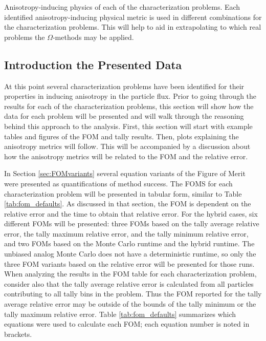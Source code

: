 \begin{table}[h!]
  \centering
  
  \caption[Anisotropy-inducing physics of each of the characterization problems.]
  {Anisotropy-inducing physics of each of the characterization problems.
  Each identified anisotropy-inducing physical metric is used in different
  combinations for the characterization problems. This will help to aid in
  extrapolating to which real problems the $\Omega$-methods may be applied.}
  \label{tab:probphysics}
\end{table}

\subsection{Introduction the Presented Data}
\label{subsec:resultsintro}

At this point several characterization problems have been identified for their
properties in inducing anisotropy in the particle flux.
Prior to going through the results for each of the characterization problems,
this section will show how the data for each problem will be presented and will
walk through the reasoning behind this approach to the analysis. First, this
section will start with example tables and figures of the FOM and tally results.
Then, plots explaining the anisotropy metrics will follow. This will be
accompanied by a
discussion about how the anisotropy metrics will be related to the FOM and the
relative error.

In Section \ref{sec:FOMvariants} several equation variants of
the Figure of Merit were
presented as quantifications of method success. The FOMS for each
characterization problem will be presented in tabular form, similar to Table
\ref{tab:fom_defaults}. As discussed in that section, the FOM is dependent on
the relative error and the time to obtain that relative error. For the hybrid
cases, six different FOMs will be presented: three FOMs based on the tally average
relative error, the tally maximum relative error, and the tally minimum relative
error, and two FOMs based on the Monte Carlo runtime and the hybrid runtime. The
unbiased analog Monte Carlo does not have a deterministic runtime, so only the
three FOM variants based on the relative error will be presented for those runs.
When analyzing the results in the FOM table for each characterization problem,
consider also that the tally average relative error is calculated from all
particles contributing to all tally bins in the problem. Thus the FOM reported
for the tally average relative error may be outside of the bounds of the tally
minimum or the tally maximum relative error.
Table \ref{tab:fom_defaults} summarizes which
equations were used to calculate each FOM; each equation number is noted
in brackets.

